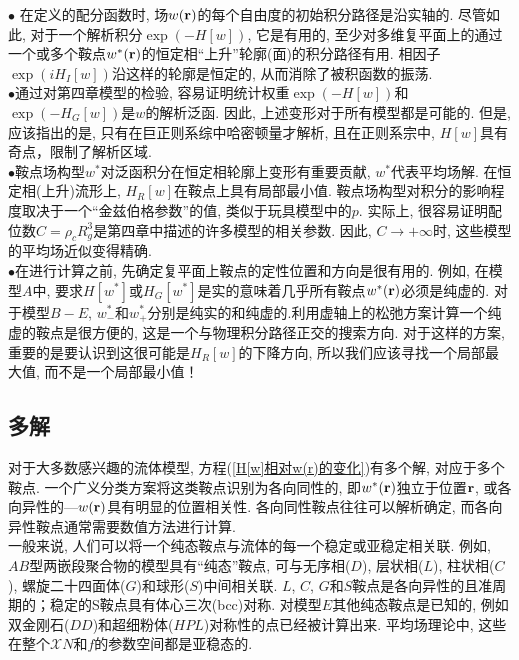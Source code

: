 $\bullet$ 在定义的配分函数时, 场$w(\mathbf{r})$的每个自由度的初始积分路径是沿实轴的. 尽管如此, 对于一个解析积分$\exp(-H[w])$, 它是有用的, 至少对多维复平面上的通过一个或多个鞍点$w^*(\mathbf{r})$的恒定相“上升”轮廓(面)的积分路径有用. 相因子$\exp(iH_I[w])$沿这样的轮廓是恒定的, 从而消除了被积函数的振荡. \\

 $\bullet$通过对第四章模型的检验, 容易证明统计权重$\exp(-H[w])$和$\exp(-H_G[w])$是$w$的解析泛函. 因此, 上述变形对于所有模型都是可能的. 但是, 应该指出的是, 只有在巨正则系综中哈密顿量才解析, 且在正则系宗中, $H[w]$具有奇点，限制了解析区域. \\

$\bullet$鞍点场构型$w^*$对泛函积分在恒定相轮廓上变形有重要贡献, $w^*$代表平均场解. 在恒定相(上升)流形上, $H_R[w]$在鞍点上具有局部最小值. 鞍点场构型对积分的影响程度取决于一个“金兹伯格参数”的值, 类似于玩具模型中的$p$. 实际上, 很容易证明配位数$C=\rho_cR_g^3$是第四章中描述的许多模型的相关参数. 因此, $C\rightarrow +\infty$时, 这些模型的平均场近似变得精确. \\

$\bullet$在进行计算之前, 先确定复平面上鞍点的定性位置和方向是很有用的. 例如, 在模型$A$中, 要求$H[w^*]$或$H_G[w^*]$是实的意味着几乎所有鞍点$w^*(\mathbf{r})$必须是纯虚的. 对于模型$B-E$, $w_{-}^*$和$w_{+}^{*}$分别是纯实的和纯虚的.利用虚轴上的松弛方案计算一个纯虚的鞍点是很方便的, 这是一个与物理积分路径正交的搜索方向. 对于这样的方案, 重要的是要认识到这很可能是$H_R[w]$的下降方向, 所以我们应该寻找一个局部最大值, 而不是一个局部最小值！\\
\subsection{多解}
对于大多数感兴趣的流体模型, 方程(\ref{H[w]相对w(r)的变化})有多个解, 对应于多个鞍点. 一个广义分类方案将这类鞍点识别为各向同性的, 即$w^*(\mathbf{r})$独立于位置$\mathbf{r}$, 或各向异性的—$w(\mathbf{r})$具有明显的位置相关性. 各向同性鞍点往往可以解析确定, 而各向异性鞍点通常需要数值方法进行计算. \\

一般来说, 人们可以将一个纯态鞍点与流体的每一个稳定或亚稳定相关联. 例如, $AB$型两嵌段聚合物的模型具有“纯态”鞍点, 可与无序相($D$), 层状相($L$), 柱状相($C$), 螺旋二十四面体($G$)和球形($S$)中间相关联. $L$, $C$, $G$和$S$鞍点是各向异性的且准周期的；稳定的S鞍点具有体心三次(bcc)对称. 对模型$E$其他纯态鞍点是已知的, 例如双金刚石($DD$)和超细粉体($HPL$)对称性的点已经被计算出来. 平均场理论中, 这些在整个$\mathcal{X}N$和$f$的参数空间都是亚稳态的. \\

